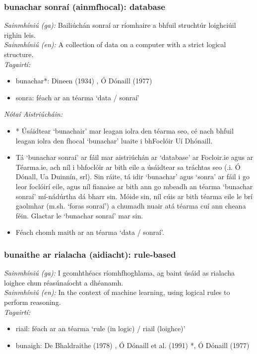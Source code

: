 \documentclass{article}
\begin{document}
\subsubsection*{bunachar sonraí (ainmfhocal): database}
 \noindent \textit{Sainmhíniú (ga):} Bailiúchán sonraí ar ríomhaire a bhfuil struchtúr loighciúil righin leis.
\\
 \noindent \textit{Sainmhíniú (en):} A collection of data on a computer with a strict logical structure.
\\
 \noindent \textit{Tagairtí:}
\begin{itemize}
	\item bunachar*: Dineen (1934) \cite{dineen}, Ó Dónaill (1977) \cite{odonaill}
	\item sonra: féach ar an téarma `data / sonraí'
\end{itemize}

 \noindent \textit{Nótaí Aistriúcháin:}
\begin{itemize}
	\item * Úsáidtear `bunachair' mar leagan iolra den téarma seo, cé nach bhfuil leagan iolra den fhocal `bunachar' luaite i bhFoclóir Uí Dhónaill.
	\item Tá `bunachar sonraí' ar fáil mar aistriúchán ar `database' ar Focloir.ie agus ar Téarma.ie, ach níl i bhfoclóir ar bith eile a úsáidtear sa tráchtas seo (.i. Ó Dónall, Ua Duinnín, srl). Sin ráite, tá idir `bunachar' agus `sonra' ar fáil i go leor foclóirí eile, agus níl fianaise ar bith ann go mbeadh an téarma `bunachar sonraí' mí-nádúrtha dá bharr sin. Móide sin, níl cúis ar bith téarma eile le brí gaolmhar (m.sh. `foras sonraí') a chumadh nuair atá téarma cuí ann cheana féin. Glactar le `bunachar sonraí' mar sin.
	\item Féach chomh maith ar an téarma `data / sonraí'.
\end{itemize}


\subsubsection*{bunaithe ar rialacha (aidiacht): rule-based}
 \noindent \textit{Sainmhíniú (ga):} I gcomhthéacs ríomhfhoghlama, ag baint úsáid as rialacha loighce chun réasúnaíocht a dhéanamh.
\\
 \noindent \textit{Sainmhíniú (en):} In the context of machine learning, using logical rules to perform reasoning.
\\
 \noindent \textit{Tagairtí:}
\begin{itemize}
	\item riail: féach ar an téarma `rule (in logic) / riail (loighce)'
	\item bunaigh: De Bhaldraithe (1978) \cite{de-bhaldraithe}, Ó Dónaill et al. (1991) \cite{focloir-beag}*, Ó Dónaill (1977) \cite{odonaill}
\end{itemize}
\end{document}
